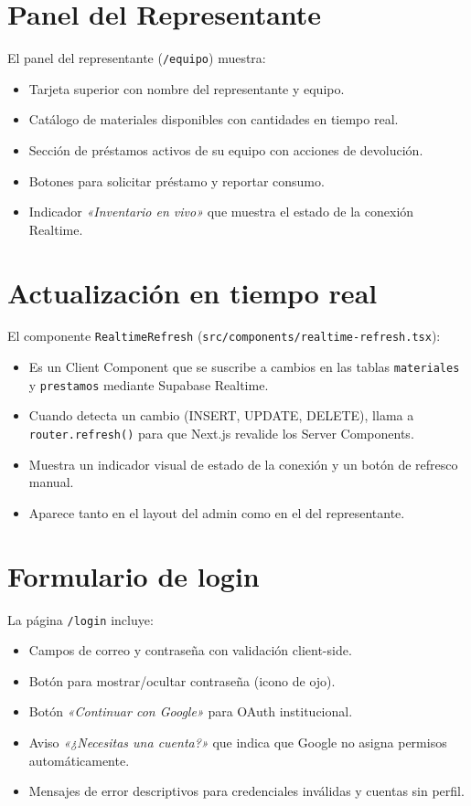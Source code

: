 \documentclass[12pt,a4paper,oneside]{report}
\newcommand{\file}[1]{\texttt{\color{cecyteDark}#1}}
\begin{document}
\section{Panel del Representante}

El panel del representante (\file{/equipo}) muestra:

\begin{itemize}
  \item Tarjeta superior con nombre del representante y equipo.
  \item Catálogo de materiales disponibles con cantidades en tiempo real.
  \item Sección de préstamos activos de su equipo con acciones de devolución.
  \item Botones para solicitar préstamo y reportar consumo.
  \item Indicador \textit{«Inventario en vivo»} que muestra el estado de la conexión Realtime.
\end{itemize}

\section{Actualización en tiempo real}

El componente \file{RealtimeRefresh} (\file{src/components/realtime-refresh.tsx}):

\begin{itemize}
  \item Es un Client Component que se suscribe a cambios en las tablas \file{materiales} y \file{prestamos} mediante Supabase Realtime.
  \item Cuando detecta un cambio (INSERT, UPDATE, DELETE), llama a \file{router.refresh()} para que Next.js revalide los Server Components.
  \item Muestra un indicador visual de estado de la conexión y un botón de refresco manual.
  \item Aparece tanto en el layout del admin como en el del representante.
\end{itemize}

\section{Formulario de login}

La página \file{/login} incluye:

\begin{itemize}
  \item Campos de correo y contraseña con validación client-side.
  \item Botón para mostrar/ocultar contraseña (icono de ojo).
  \item Botón \textit{«Continuar con Google»} para OAuth institucional.
  \item Aviso \textit{«¿Necesitas una cuenta?»} que indica que Google no asigna permisos automáticamente.
  \item Mensajes de error descriptivos para credenciales inválidas y cuentas sin perfil.
\end{itemize}
\end{document}
